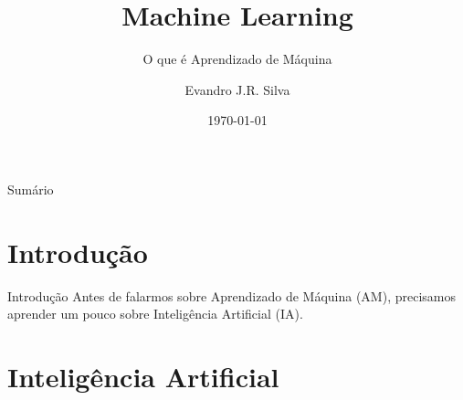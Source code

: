 \documentclass{libs/ufc_format}
\title[ML]{\huge\textbf{Machine Learning}}
\subtitle{O que é Aprendizado de Máquina}
\author{Evandro J.R. Silva}
\institute[Estácio Teresina]{
    \normalsize{\email{ejrs.profissional@gmail.com}}
    \newline
    \department{Bacharelado em Ciência da Computação}
    \newline
    \estaciothe
}
\date{\today}
\begin{document}


\begin{frame}{}
    \maketitle
\end{frame}

\begin{frame}{Sumário}
    \begin{multicols}{2}
        \tableofcontents
    \end{multicols}
\end{frame}

\section{Introdução}

\begin{frame}{Introdução}
    \centering
    \large Antes de falarmos sobre Aprendizado de Máquina (AM), precisamos aprender um pouco sobre Inteligência Artificial (IA).
\end{frame}

\section{Inteligência Artificial}
\end{document}

